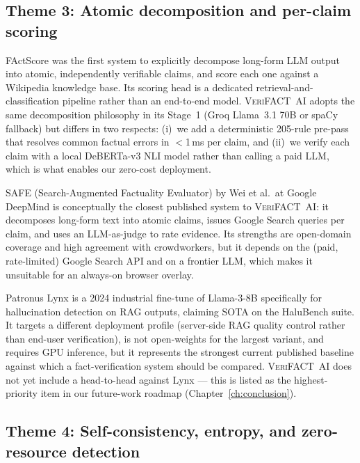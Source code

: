\documentclass[12pt, a4paper, oneside]{report}
\newcommand{\verifact}{\textsc{VeriFACT~AI}}
\begin{document}
\subsection{Theme 3: Atomic decomposition and per-claim scoring}

FActScore \cite{min2023factscore} was the first system to explicitly decompose long-form LLM output into atomic, independently verifiable claims, and score each one against a Wikipedia knowledge base. Its scoring head is a dedicated retrieval-and-classification pipeline rather than an end-to-end model. \verifact{} adopts the same decomposition philosophy in its Stage~1 (Groq Llama~3.1 70B or spaCy fallback) but differs in two respects: (i)~we add a deterministic 205-rule pre-pass that resolves common factual errors in $<$1\,ms per claim, and (ii)~we verify each claim with a local DeBERTa-v3 NLI model rather than calling a paid LLM, which is what enables our zero-cost deployment.

SAFE (Search-Augmented Factuality Evaluator) by Wei et al.\ at Google DeepMind \cite{wei2024safe} is conceptually the closest published system to \verifact{}: it decomposes long-form text into atomic claims, issues Google Search queries per claim, and uses an LLM-as-judge to rate evidence. Its strengths are open-domain coverage and high agreement with crowdworkers, but it depends on the (paid, rate-limited) Google Search API and on a frontier LLM, which makes it unsuitable for an always-on browser overlay.

Patronus Lynx \cite{patronus2024lynx} is a 2024 industrial fine-tune of Llama-3-8B specifically for hallucination detection on RAG outputs, claiming SOTA on the HaluBench suite. It targets a different deployment profile (server-side RAG quality control rather than end-user verification), is not open-weights for the largest variant, and requires GPU inference, but it represents the strongest current published baseline against which a fact-verification system should be compared. \verifact{} does not yet include a head-to-head against Lynx --- this is listed as the highest-priority item in our future-work roadmap (Chapter~\ref{ch:conclusion}).

\subsection{Theme 4: Self-consistency, entropy, and zero-resource detection}
\end{document}
